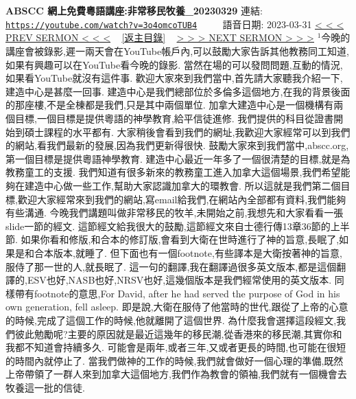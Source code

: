 \documentclass{book}
\begin{document}
\section{}
\label{sec:3o4omcoTUB4}
\textbf{ABSCC 網上免費粵語講座:非常移民牧養\_20230329}
\newline
\newline
連結: \href{https://youtube.com/watch?v=3o4omcoTUB4}{\texttt{https://youtube.com/watch?v=3o4omcoTUB4}} ~~~~ 語音日期: 2023-03-31
\newline
\newline
\hyperref[sec:efm9yyrZOo0]{\small{< < < PREV SERMON < < <}}
~
\hyperref[sec:index]{\small{[返主目錄]}}
~
\hyperref[sec:B5n__dtTRhE]{\small{> > > NEXT SERMON > > >}}
\newline
\newline
$^{1}$今晚的講座會被錄影,遲一兩天會在YouTube帳戶內,可以鼓勵大家告訴其他教務同工知道,如果有興趣可以在YouTube看今晚的錄影.
當然在場的可以發問問題,互動的情況,如果看YouTube就沒有這件事.
歡迎大家來到我們當中,首先請大家聽我介紹一下,建造中心是甚麼一回事.
建造中心是我們總部位於多倫多這個地方,在我的背景後面的那座樓,不是全棟都是我們,只是其中兩個單位.
加拿大建造中心是一個機構有兩個目標,一個目標是提供粵語的神學教育,給平信徒進修.
我們提供的科目從證書開始到碩士課程的水平都有.
大家稍後會看到我們的網址,我歡迎大家經常可以到我們的網站,看我們最新的發展,因為我們更新得很快.
鼓勵大家來到我們當中,abscc.org,第一個目標是提供粵語神學教育.
建造中心最近一年多了一個很清楚的目標,就是為教務童工的支援.
我們知道有很多新來的教務童工進入加拿大這個場景,我們希望能夠在建造中心做一些工作,幫助大家認識加拿大的環教會.
所以這就是我們第二個目標,歡迎大家經常來到我們的網站,寫email給我們,在網站內全部都有資料,我們能夠有些溝通.
今晚我們講題叫做非常移民的牧羊,未開始之前,我想先和大家看看一張slide一節的經文.
這節經文給我很大的鼓勵,這節經文來自士德行傳13章36節的上半節.
如果你看和修版,和合本的修訂版,會看到大衛在世時進行了神的旨意,長眠了,如果是和合本版本,就睡了.
但下面也有一個footnote,有些譯本是大衛按著神的旨意,服侍了那一世的人,就長眠了.
這一句的翻譯,我在翻譯過很多英文版本,都是這個翻譯的,ESV也好,NASB也好,NRSV也好,這幾個版本是我們經常使用的英文版本.
同樣帶有footnote的意思,For David, after he had served the purpose of God in his own generation, fell asleep.
即是說,大衛在服侍了他當時的世代,跟從了上帝的心意的時候,完成了這個工作的時候,他就離開了這個世界.
為什麼我會選擇這段經文,我們彼此勉勵呢?主要的原因就是最近這幾年的移民潮,從香港來的移民潮,其實你和我都不知道會持續多久.
可能會是兩年,或者三年,又或者更長的時間,也可能在很短的時間內就停止了.
當我們做神的工作的時候,我們就會做好一個心理的準備,既然上帝帶領了一群人來到加拿大這個地方,我們作為教會的領袖,我們就有一個機會去牧養這一批的信徒.
\end{document}
